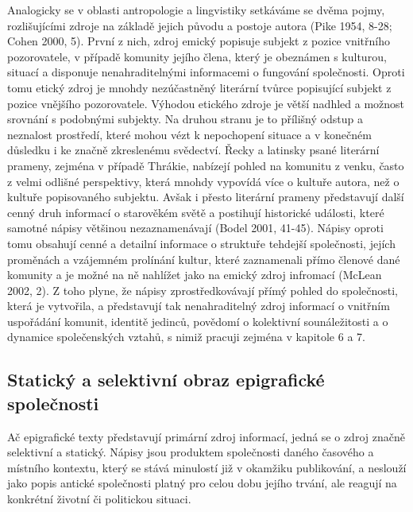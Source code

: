 Analogicky se v oblasti antropologie a lingvistiky setkáváme se dvěma pojmy, rozlišujícími zdroje na základě jejich původu a postoje autora (Pike 1954, 8-28; Cohen 2000, 5). První z nich, zdroj emický popisuje subjekt z pozice vnitřního pozorovatele, v případě komunity jejího člena, který je obeznámen s kulturou, situací a disponuje nenahraditelnými informacemi o fungování společnosti. Oproti tomu etický zdroj je mnohdy nezúčastněný literární tvůrce popisující subjekt z pozice vnějšího pozorovatele. Výhodou etického zdroje je větší nadhled a možnost srovnání s podobnými subjekty. Na druhou stranu je to přílišný odstup a neznalost prostředí, které mohou vézt k nepochopení situace a v konečném důsledku i ke značně zkreslenému svědectví. Řecky a latinsky psané literární prameny, zejména v případě Thrákie, nabízejí pohled na komunitu z venku, často z velmi odlišné perspektivy, která mnohdy vypovídá více o kultuře autora, než o kultuře popisovaného subjektu. Avšak i přesto literární prameny představují další cenný druh informací o starověkém světě a postihují historické události, které samotné nápisy většinou nezaznamenávají (Bodel 2001, 41-45). Nápisy oproti tomu obsahují cenné a detailní informace o struktuře tehdejší společnosti, jejích proměnách a vzájemném prolínání kultur, které zaznamenali přímo členové dané komunity a je možné na ně nahlížet jako na emický zdroj infromací (McLean 2002, 2). Z toho plyne, že nápisy zprostředkovávají přímý pohled do společnosti, která je vytvořila, a představují tak nenahraditelný zdroj informací o vnitřním uspořádání komunit, identitě jedinců, povědomí o kolektivní sounáležitosti a o dynamice společenských vztahů, s nimiž pracuji zejména v kapitole 6 a 7.

\subsection[statický-a-selektivní-obraz-epigrafické-společnosti]{Statický a selektivní obraz epigrafické společnosti}

Ač epigrafické texty představují primární zdroj informací, jedná se o zdroj značně selektivní a statický. Nápisy jsou produktem společnosti daného časového a místního kontextu, který se stává minulostí již v okamžiku publikování, a neslouží jako popis antické společnosti platný pro celou dobu jejího trvání, ale reagují na konkrétní životní či politickou situaci.

